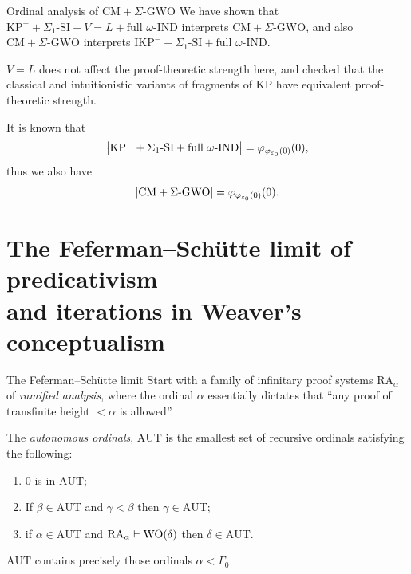 \documentclass{beamer}
\begin{document}
\begin{frame}{Ordinal analysis of $\mathrm{CM} + \Sigma\text{-}\mathrm{GWO}$}
  We have shown that $\mathrm{KP}^- + \Sigma_1\text{-}\mathrm{SI} + V = L + \text{full $\omega$-$\mathrm{IND}$}$ interprets $\mathrm{CM} + \Sigma\text{-}\mathrm{GWO}$, and also $\mathrm{CM} + \Sigma\text{-}\mathrm{GWO}$ interprets $\mathrm{IKP}^- + \Sigma_1\text{-}\mathrm{SI} + \text{full $\omega$-$\mathrm{IND}$}$.

  \vspace{1em}

  $V = L$ does not affect the proof-theoretic strength here, and  checked that the classical and intuitionistic variants of fragments of $\mathrm{KP}$ have equivalent proof-theoretic strength.

  \vspace{1em}

  It is known \cite{rathjen93-kp-fragments} that
  \[\left|\mathrm{KP}^- + \Sigma_1\text{-}\mathrm{SI} + \text{full $\omega$-$\mathrm{IND}$}\right| = \varphi_{\varphi_{\varepsilon_0}\mleft(0\mright)}\mleft(0\mright),\]
  thus we also have
  \[\left|\mathrm{CM} + \Sigma\text{-}\mathrm{GWO}\right| = \varphi_{\varphi_{\varepsilon_0}\mleft(0\mright)}\mleft(0\mright).\]
\end{frame}

\section{The Feferman--Sch\"utte limit of predicativism\\and iterations in Weaver's conceptualism}

\begin{frame}{The Feferman--Sch\"utte limit}
  Start with a family of infinitary proof systems $\mathrm{RA}_\alpha$ of \emph{ramified analysis}, where the ordinal $\alpha$ essentially dictates that ``any proof of transfinite height $<\alpha$ is allowed''.

  \begin{definition}
    The \emph{autonomous ordinals}, $\mathrm{AUT}$ is the smallest set of recursive ordinals satisfying the following:
    \begin{enumerate}
      \item $0$ is in $\mathrm{AUT}$;
      \item If $\beta \in \mathrm{AUT}$ and $\gamma < \beta$ then $\gamma \in \mathrm{AUT}$;
      \item if $\alpha \in \mathrm{AUT}$ and $\mathrm{RA}_\alpha \vdash \mathrm{WO}\mleft(\delta\mright)$ then $\delta \in \mathrm{AUT}$.
            \setcounter{autenumi}{\value{enumi}}
    \end{enumerate}
  \end{definition}

  \begin{theorem}
    $\mathrm{AUT}$ contains precisely those ordinals $\alpha < \Gamma_0$.
  \end{theorem}
\end{frame}
\end{document}
